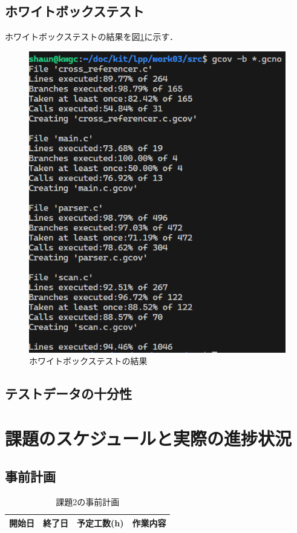 \documentclass{jlreq}
\begin{document}
\subsection{ホワイトボックステスト}
ホワイトボックステストの結果を図\ref{fig:white_box_test}に示す．
\begin{figure}[H]
  \centering
  \includegraphics[width=\textwidth]{assets/white_box_test.png}
  \caption{ホワイトボックステストの結果}
  \label{fig:white_box_test}
\end{figure}

\subsection{テストデータの十分性}

\section{課題のスケジュールと実際の進捗状況}
\subsection{事前計画}
\begin{table}[H]
  \centering
  \caption{課題2の事前計画}
  \begin{tabular}{cccp{7cm}}
    \hline
    開始日 & 終了日 & 予定工数(h) & 作業内容 \\ \hline
  \end{tabular}
\end{table}
\end{document}
